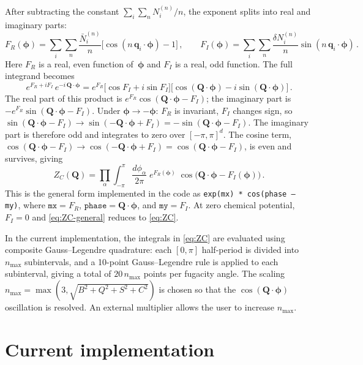 \documentclass[11pt,a4paper]{article}
\newcommand{\bphi}{\bm{\phi}}
\newcommand{\bq}{\bm{q}}
\newcommand{\bQ}{\bm{Q}}
\begin{document}
After subtracting the constant $\sum_i \sum_n N_i^{(n)}/n$, the exponent splits into real and imaginary parts:
\begin{equation}\label{eq:F-split}
  F_R(\bphi) = \sum_i \sum_n \frac{\bar{N}_i^{(n)}}{n}\bigl[\cos(n\,\bq_i\cdot\bphi) - 1\bigr]\,,
  \qquad
  F_I(\bphi) = \sum_i \sum_n \frac{\delta N_i^{(n)}}{n}\sin(n\,\bq_i\cdot\bphi)\,.
\end{equation}
Here $F_R$ is a real, even function of~$\bphi$ and $F_I$ is a real, odd function.
The full integrand becomes
\begin{equation}\label{eq:integrand-split}
  e^{F_R + iF_I}\,e^{-i\,\bQ\cdot\bphi}
  = e^{F_R}\bigl[\cos F_I + i\sin F_I\bigr]\bigl[\cos(\bQ\cdot\bphi) - i\sin(\bQ\cdot\bphi)\bigr]\,.
\end{equation}
The real part of this product is $e^{F_R}\cos(\bQ\cdot\bphi - F_I)$; the imaginary part is $-e^{F_R}\sin(\bQ\cdot\bphi - F_I)$.
Under $\bphi \to -\bphi$: $F_R$ is invariant, $F_I$ changes sign, so $\sin(\bQ\cdot\bphi - F_I) \to \sin(-\bQ\cdot\bphi + F_I) = -\sin(\bQ\cdot\bphi - F_I)$.
The imaginary part is therefore odd and integrates to zero over $[-\pi,\pi]^d$.
The cosine term, $\cos(\bQ\cdot\bphi - F_I) \to \cos(-\bQ\cdot\bphi + F_I) = \cos(\bQ\cdot\bphi - F_I)$, is even and survives, giving
\begin{equation}\label{eq:ZC-general}
  Z_C(\bQ) = \prod_{\alpha} \int_{-\pi}^{\pi} \frac{d\phi_\alpha}{2\pi}\;
  e^{F_R(\bphi)}\;\cos\bigl(\bQ \cdot \bphi - F_I(\bphi)\bigr)\,.
\end{equation}
This is the general form implemented in the code as \texttt{exp(mx) * cos(phase -- my)}, where $\texttt{mx} = F_R$, $\texttt{phase} = \bQ \cdot \bphi$, and $\texttt{my} = F_I$.
At zero chemical potential, $F_I = 0$ and \cref{eq:ZC-general} reduces to \cref{eq:ZC}.

In the current implementation, the integrals in \cref{eq:ZC} are evaluated using composite Gauss--Legendre quadrature: each $[0, \pi]$ half-period is divided into $n_{\max}$ subintervals, and a 10-point Gauss--Legendre rule is applied to each subinterval, giving a total of $20\,n_{\max}$ points per fugacity angle.
The scaling $n_{\max} = \max(3, \sqrt{B^2 + Q^2 + S^2 + C^2})$ is chosen so that the $\cos(\bQ \cdot \bphi)$ oscillation is resolved.
An external multiplier allows the user to increase $n_{\max}$.


\section{Current implementation}
\label{sec:current}
\end{document}
